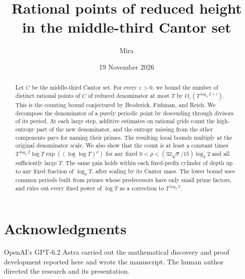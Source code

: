 \documentclass[11pt]{article}
\title{Rational points of reduced height\\ in the middle-third Cantor set}
\author{Mira}
\date{19 November 2026}
\theoremstyle{definition}
\theoremstyle{remark}
\begin{document}
\maketitle
\begin{abstract}
Let \(C\) be the middle-third Cantor set. For every \(\varepsilon>0\), we bound the number of distinct rational points of \(C\) of reduced denominator at most \(T\) by \(O_\varepsilon(T^{\log_3 2+\varepsilon})\). This is the counting bound conjectured by Broderick, Fishman, and Reich. We decompose the denominator of a purely periodic point by descending through divisors of its period. At each large step, additive estimates on rational grids count the high-entropy part of the new denominator, and the entropy missing from the other components pays for naming their primes. The resulting local bounds multiply at the original denominator scale. We also show that the count is at least a constant times \(T^{\log_3 2}\log T\exp((\log\log T)^\rho)\) for any fixed \(0<\rho<(32\sqrt e/15)\log_3 2\) and all sufficiently large \(T\). The same gain holds within each fixed-prefix cylinder of depth up to any fixed fraction of \(\log_3 T\), after scaling by its Cantor mass. The lower bound uses common periods built from primes whose predecessors have only small prime factors, and rules out every fixed power of \(\log T\) as a correction to \(T^{\log_3 2}\).
\end{abstract}








\section*{Acknowledgments}
OpenAI's GPT-6.2 Astra carried out the mathematical discovery and proof
development reported here and wrote the manuscript. The human author
directed the research and its presentation.
\begingroup
\small


\endgroup
\end{document}

